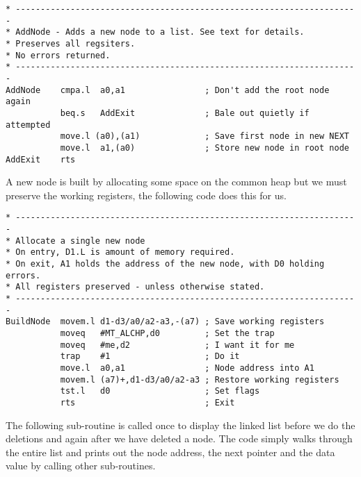 \begin{lstlisting}[firstnumber=last,caption={Single Linked List - Demo Code - Add Node}]
* ---------------------------------------------------------------------
* AddNode - Adds a new node to a list. See text for details.
* Preserves all regsiters.
* No errors returned.
* ---------------------------------------------------------------------
AddNode    cmpa.l  a0,a1                ; Don't add the root node again
           beq.s   AddExit              ; Bale out quietly if attempted
           move.l (a0),(a1)             ; Save first node in new NEXT
           move.l  a1,(a0)              ; Store new node in root node
AddExit    rts
\end{lstlisting}

A new node is built by allocating some space on the common heap but
    we must preserve the working registers, the following code does this for
    us.

\begin{lstlisting}[firstnumber=last,caption={Single Linked List - Demo Code - Build Node}]
* ---------------------------------------------------------------------
* Allocate a single new node
* On entry, D1.L is amount of memory required.
* On exit, A1 holds the address of the new node, with D0 holding errors.
* All registers preserved - unless otherwise stated.
* ---------------------------------------------------------------------
BuildNode  movem.l d1-d3/a0/a2-a3,-(a7) ; Save working registers
           moveq   #MT_ALCHP,d0         ; Set the trap
           moveq   #me,d2               ; I want it for me
           trap    #1                   ; Do it
           move.l  a0,a1                ; Node address into A1
           movem.l (a7)+,d1-d3/a0/a2-a3 ; Restore working registers
           tst.l   d0                   ; Set flags
           rts                          ; Exit
\end{lstlisting}

The following sub-{}routine is called once to display the linked list
    before we do the deletions and again after we have deleted a node. The
    code simply walks through the entire list and prints out the node address,
    the next pointer and the data value by calling other sub-{}routines.

